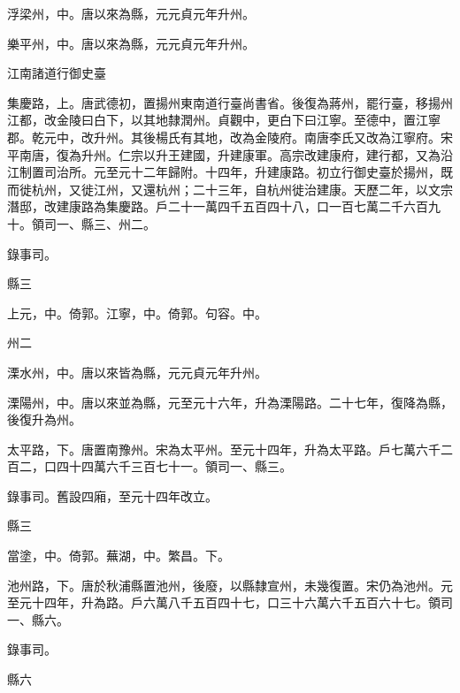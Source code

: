\begin{pinyinscope}
 浮梁州，中。唐以來為縣，元元貞元年升州。



 樂平州，中。唐以來為縣，元元貞元年升州。



 江南諸道行御史臺



 集慶路，上。唐武德初，置揚州東南道行臺尚書省。後復為蔣州，罷行臺，移揚州江都，改金陵曰白下，以其地隸潤州。貞觀中，更白下曰江寧。至德中，置江寧郡。乾元中，改升州。其後楊氏有其地，改為金陵府。南唐李氏又改為江寧府。宋平南唐，復為升州。仁宗以升王建國，升建康軍。高宗改建康府，建行都，又為沿江制置司治所。元至元十二年歸附。十四年，升建康路。初立行御史臺於揚州，既而徙杭州，又徙江州，又還杭州；二十三年，自杭州徙治建康。天歷二年，以文宗潛邸，改建康路為集慶路。戶二十一萬四千五百四十八，口一百七萬二千六百九十。領司一、縣三、州二。



 錄事司。



 縣三



 上元，中。倚郭。江寧，中。倚郭。句容。中。



 州二



 溧水州，中。唐以來皆為縣，元元貞元年升州。



 溧陽州，中。唐以來並為縣，元至元十六年，升為溧陽路。二十七年，復降為縣，後復升為州。



 太平路，下。唐置南豫州。宋為太平州。至元十四年，升為太平路。戶七萬六千二百二，口四十四萬六千三百七十一。領司一、縣三。



 錄事司。舊設四廂，至元十四年改立。



 縣三



 當塗，中。倚郭。蕪湖，中。繁昌。下。



 池州路，下。唐於秋浦縣置池州，後廢，以縣隸宣州，未幾復置。宋仍為池州。元至元十四年，升為路。戶六萬八千五百四十七，口三十六萬六千五百六十七。領司一、縣六。



 錄事司。



 縣六




\end{pinyinscope}
